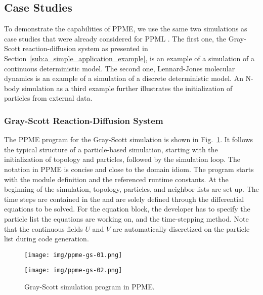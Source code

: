 
\subsection{Case Studies} %
\label{sub:case_studies}

To demonstrate the capabilities of PPME, we use the same two simulations as case
studies that were already considered for PPML \cite{Awile:2013a}. The first one, the Gray-Scott reaction-diffusion system as presented in
Section~\ref{sub:a_simple_application_example}, is an example of a simulation of a continuous
deterministic model. The second one, Lennard-Jones molecular dynamics is an example of a simulation of a 
discrete deterministic model. An N-body simulation as a third example further illustrates the initialization of particles from external data. 

\subsubsection{Gray-Scott Reaction-Diffusion System} %
\label{par:gray_scott_reaction_diffusios_system}
  The PPME program for the Gray-Scott simulation is shown in Fig.~\ref{fig:ppme-gs}. It follows the typical structure of a particle-based simulation, starting
  with the initialization of topology and particles, followed by the simulation loop.
  The notation in PPME is concise and close to the domain idiom.
  The program starts with
  the module definition and the referenced runtime constants. At the beginning of the
  simulation, topology, particles, and neighbor lists are set up. The time steps are contained in the  and are solely defined through
  the differential equations to be solved. For the equation block, the developer has to specify the
  particle list the equations are working on, and the time-stepping method. Note that
  the continuous fields $U$ and $V$ are automatically discretized on the particle
  list during code generation. 

  \begin{figure}[tp]
    \centering
    \begin{minipage}{.49\textwidth}
      \texttt{[image: img/ppme-gs-01.png]}
    \end{minipage}
    \begin{minipage}{.50\textwidth}
      \texttt{[image: img/ppme-gs-02.png]}
    \end{minipage}
    \caption{Gray-Scott simulation program in PPME.}
    \label{fig:ppme-gs}
  \end{figure}


